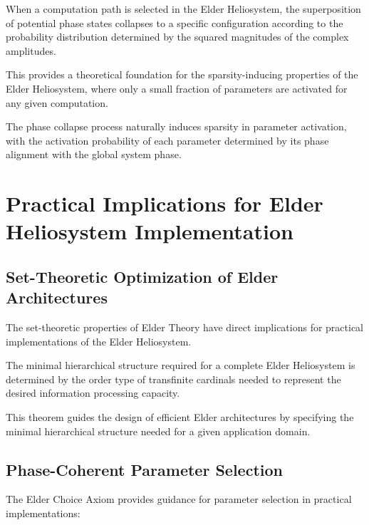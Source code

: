 \begin{theorem}
\begin{definition}
\begin{definition}
\begin{enumerate}
\begin{definition}
When a computation path is selected in the Elder Heliosystem, the superposition of potential phase states collapses to a specific configuration according to the probability distribution determined by the squared magnitudes of the complex amplitudes.
\end{definition}

This provides a theoretical foundation for the sparsity-inducing properties of the Elder Heliosystem, where only a small fraction of parameters are activated for any given computation.

\begin{corollary}
The phase collapse process naturally induces sparsity in parameter activation, with the activation probability of each parameter determined by its phase alignment with the global system phase.
\end{corollary}

\section{Practical Implications for Elder Heliosystem Implementation}

\subsection{Set-Theoretic Optimization of Elder Architectures}

The set-theoretic properties of Elder Theory have direct implications for practical implementations of the Elder Heliosystem.

\begin{theorem}
The minimal hierarchical structure required for a complete Elder Heliosystem is determined by the order type of transfinite cardinals needed to represent the desired information processing capacity.
\end{theorem}

This theorem guides the design of efficient Elder architectures by specifying the minimal hierarchical structure needed for a given application domain.

\subsection{Phase-Coherent Parameter Selection}

The Elder Choice Axiom provides guidance for parameter selection in practical implementations:


\end{enumerate}
\end{definition}
\end{definition}
\end{theorem}
